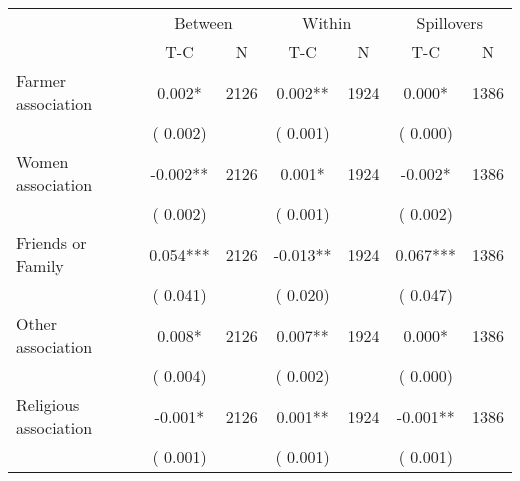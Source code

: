 
\begin{tabular}{l*{6}{c}}\hline&\multicolumn{2}{c}{Between}&\multicolumn{2}{c}{Within}&\multicolumn{2}{c}{Spillovers} \\ \cmidrule(r){2-3}\cmidrule(l){4-5}\cmidrule(l){6-7} & {T-C} & {N} & {T-C} & {N}  & {T-C}  & {N}  \\ \midrule
Farmer association        &              0.002*      &       2126       &              0.002**      &       1924       &              0.000*      &       1386       \\
                       &       (       0.002)            &                               &       (       0.001)            &                               &       (       0.000)            &                               \\
Women association        &             -0.002**      &       2126       &              0.001*      &       1924       &             -0.002*      &       1386       \\
                       &       (       0.002)            &                               &       (       0.001)            &                               &       (       0.002)            &                               \\
Friends or Family        &              0.054***      &       2126       &             -0.013**      &       1924       &              0.067***      &       1386       \\
                       &       (       0.041)            &                               &       (       0.020)            &                               &       (       0.047)            &                               \\
Other association        &              0.008*      &       2126       &              0.007**      &       1924       &              0.000*      &       1386       \\
                       &       (       0.004)            &                               &       (       0.002)            &                               &       (       0.000)            &                               \\
Religious association        &             -0.001*      &       2126       &              0.001**      &       1924       &             -0.001**      &       1386       \\
                       &       (       0.001)            &                               &       (       0.001)            &                               &       (       0.001)            &                               \\

\end{tabular}
